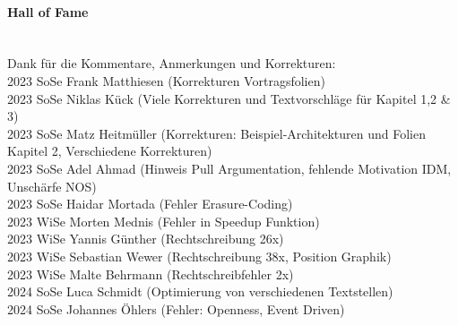 \documentclass[a4paper,10pt]{book}
\begin{document}
\paragraph{Hall of Fame}
\mbox{}\\
Dank für die Kommentare, Anmerkungen und Korrekturen:  \\
2023 SoSe Frank Matthiesen (Korrekturen Vortragsfolien) \\
2023 SoSe Niklas Kück (Viele Korrekturen und Textvorschläge für Kapitel 1,2 \& 3)\\
2023 SoSe Matz Heitmüller (Korrekturen: Beispiel-Architekturen und Folien Kapitel 2, Verschiedene Korrekturen) \\
2023 SoSe Adel Ahmad (Hinweis Pull Argumentation, fehlende Motivation IDM, Unschärfe NOS) \\
2023 SoSe Haidar Mortada (Fehler  Erasure-Coding) \\
2023 WiSe Morten Mednis (Fehler in Speedup Funktion) \\
2023 WiSe Yannis Günther (Rechtschreibung 26x) \\
2023 WiSe Sebastian Wewer (Rechtschreibung 38x, Position Graphik) \\
2023 WiSe Malte Behrmann (Rechtschreibfehler 2x)\\
2024 SoSe Luca Schmidt (Optimierung von verschiedenen Textstellen) \\
2024 SoSe Johannes Öhlers (Fehler: Openness, Event Driven)\\
\\
\tableofcontents
\newpage

\newpage

\newpage

\newpage


\newpage


\newpage


\newpage




\renewcommand{\indexname}{Stichwortverzeichnis}
\printindex
\newpage
\printbibliography
\end{document}
